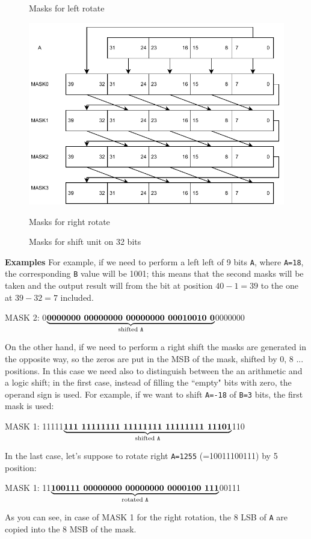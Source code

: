\begin{figure}[h]
\begin{minipage}[b]{0.5\linewidth}
		\caption{Masks for left rotate} 
		\vspace{4ex}
	\end{minipage}%
	\begin{minipage}[b]{0.5\linewidth}
		\centering
		\includegraphics[width=.78\linewidth]{chapters/5_ExecuteStage/images/right_rotate.pdf} 
		\caption{Masks for right rotate} 
		\vspace{4ex}
	\end{minipage} 
	\caption{Masks for shift unit on 32 bits} 
\end{figure}
\begin{mybox}
	\textbf{Examples}
	\newline
	For example, if we need to perform a left left of 9 bits \texttt{A}, where \texttt{A=18}, the corresponding \texttt{B} value will be 1001; this means that the second masks will be taken and the output result will from the bit at position $40-1=39$ to the one at $39-32=7$ included.
	\begin{center}
		MASK 2: 0$\underbrace{\textbf{0000000 00000000 00000000 00010010 0}}_{\text{shifted \texttt{A}}}$0000000
	\end{center}
	
	On the other hand, if we need to perform a right shift the masks are generated in the opposite way, so the zeros are put in the MSB of the mask, shifted by 0, 8 ... positions. In this case we need also to distinguish between the an arithmetic and a logic shift; in the first case, instead of filling the ``empty" bits with zero, the operand sign is used. For example, if we want to shift \texttt{A=-18} of \texttt{B=3} bits, the first mask is used: 
	\begin{center}
		MASK 1: 11111$\underbrace{\textbf{111 11111111 11111111 11111111 11101}}_{\text{shifted \texttt{A}}}$110
	\end{center}
	
	In the last case, let's suppose to rotate right \texttt{A=1255} (=10011100111) by 5 position:
	\begin{center}
		MASK 1: 11$\underbrace{\textbf{100111 00000000 00000000 0000100 111}}_{\text{rotated \texttt{A}}}$00111
	\end{center}
	As you can see, in case of MASK 1 for the right rotation, the 8 LSB of \texttt{A} are copied into the 8 MSB of the mask.
\end{mybox}
	


